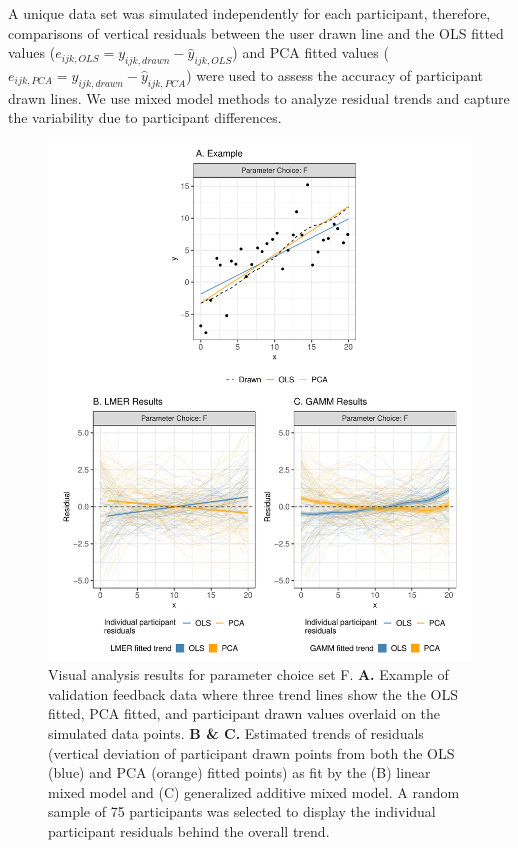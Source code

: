 \documentclass[
]{jds}
\begin{document}
A unique data set was simulated independently for each participant,
therefore, comparisons of vertical residuals between the user drawn line
and the OLS fitted values
(\(e_{ijk,OLS} = y_{ijk,drawn} - \hat y_{ijk,OLS}\)) and PCA fitted
values (\(e_{ijk,PCA} = y_{ijk,drawn} - \hat y_{ijk,PCA}\)) were used to
assess the accuracy of participant drawn lines. We use mixed model
methods to analyze residual trends and capture the variability due to
participant differences.

\begin{figure}

{\centering \includegraphics{./images/fig-eyefitting-plots-1.pdf}

}

\caption{\label{fig-eyefitting-plots}Visual analysis results for
parameter choice set F. \linebreak \textbf{A.} Example of validation
feedback data where three trend lines show the the OLS fitted, PCA
fitted, and participant drawn values overlaid on the simulated data
points. \linebreak \textbf{B \& C.} Estimated trends of residuals
(vertical deviation of participant drawn points from both the OLS (blue)
and PCA (orange) fitted points) as fit by the (B) linear mixed model and
(C) generalized additive mixed model. A random sample of 75 participants
was selected to display the individual participant residuals behind the
overall trend.}

\end{figure}
\end{document}
